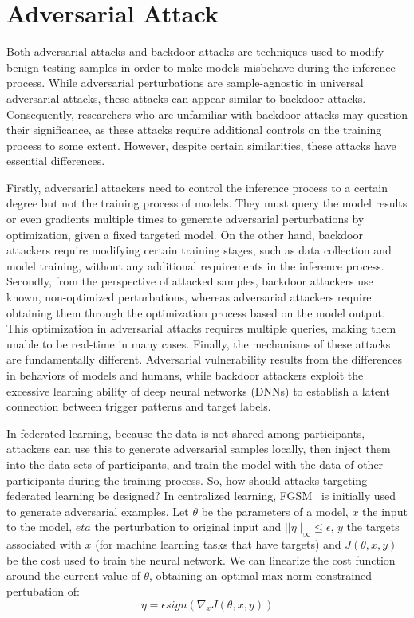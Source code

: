 \section{Adversarial Attack}  
Both adversarial attacks and backdoor attacks are
techniques used to modify benign testing samples in order
to make models misbehave during the inference process.
While adversarial perturbations are sample-agnostic in
universal adversarial attacks, these attacks can appear
similar to backdoor attacks. Consequently, researchers
who are unfamiliar with backdoor attacks may question
their significance, as these attacks require additional
controls on the training process to some extent. However,
despite certain similarities, these attacks have essential
differences.

Firstly, adversarial attackers need to control the
inference process to a certain degree but not the training
process of models. They must query the model results
or even gradients multiple times to generate adversarial
perturbations by optimization, given a fixed targeted
model. On the other hand, backdoor attackers require
modifying certain training stages, such as data collection
and model training, without any additional requirements
in the inference process. Secondly, from the perspective
of attacked samples, backdoor attackers use known,
non-optimized perturbations, whereas adversarial attackers
require obtaining them through the optimization process
based on the model output. This optimization in
adversarial attacks requires multiple queries, making them unable
to be real-time in many cases. Finally, the mechanisms
of these attacks are fundamentally different. Adversarial
vulnerability results from the differences in behaviors of
models and humans, while backdoor attackers exploit the
excessive learning ability of deep neural networks (DNNs)
to establish a latent connection between trigger patterns
and target labels.  

In federated learning, because the data is not shared
among participants, attackers can use this to generate
adversarial samples locally, then inject them into the data
sets of participants, and train the model with the data of
other participants during the training process.
So, how should attacks targeting federated learning be
designed? In centralized learning, FGSM~\cite{goodfellow2014explaining} is initially
used to generate adversarial examples. Let $\theta$ be the parameters of a model, $x$ the input to the model,
$eta$ the perturbation to original input and $||\eta||_\infty \le \epsilon$,
$y$ the targets associated with $x$ (for machine learning tasks that have targets)
and $J(\theta, x, y)$ be the cost used to train the neural network.
We can linearize the cost function around the current value of $\theta$,
obtaining an optimal max-norm constrained pertubation of:
\begin{equation}
    \eta = \epsilon sign(\nabla_x J(\theta,x,y))
\end{equation}

